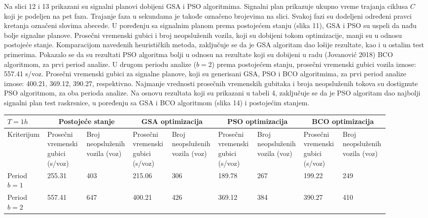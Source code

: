 Na slici 12 i 13 prikazani su signalni planovi dobijeni GSA i PSO algoritmima. Signalni plan prikazuje ukupno vreme trajanja ciklusa $C$ koji je podeljen na pet faza. Trajanje faza u sekundama je takođe označeno brojevima na slici. Svakoj fazi su dodeljeni određeni pravci kretanja označeni slovima abecede. U poređenju sa signalnim planom prema postojećem stanju (slika 11), GSA i PSO su uspeli da nađu bolje signalne planove. Prosečni vremenski gubici i broj neopsluženih vozila, koji su dobijeni tokom optimizacije, manji su u odnosu postojeće stanje. Komparacijom navedenih heurističkih metoda, zaključuje se da je GSA algoritam dao lošije rezultate, kao i u ostalim test primerima. Pokazalo se da su rezultati PSO algoritma bolji u odnosu na rezultate koji su dobijeni u radu (Jovanović 2018) BCO algoritmom, za prvi period analize.  
U drugom periodu analize ($b=2$) prema postojećem stanju, prosečni vremenski gubici vozila iznose: 557.41 s/voz. Prosečni vremenski gubici za signalne planove, koji su generisani GSA, PSO i BCO algoritmima, za prvi period analize iznose: 400.21, 369.12, 390.27, respektivno. Najmanje vrednosti prosečnih vremenskih gubitaka i broja neopsluženih tokova su dostignute PSO algoritmom, za oba perioda analize. Na osnovu rezultata koji su prikazani u tabeli 4, zaključuje se da je PSO algoritam dao najbolji signalni plan test raskrsnice, u poređenju sa GSA i BCO algoritmom (slika 14) i postojećim stanjem.


\begin{table*}
    \begin{center}
      \begin{tabular}{p{0.1\linewidth}p{0.1\linewidth}p{0.1\linewidth}p{0.1\linewidth}p{0.1\linewidth}p{0.1\linewidth}p{0.1\linewidth}p{0.1\linewidth}p{0.1\linewidth}}
        \toprule
        $ T = 1h $ & \multicolumn{2}{c}{\textbf{Postojeće stanje}}
        & \multicolumn{2}{c}{\textbf{GSA optimizacija}}
        & \multicolumn{2}{c}{\textbf{PSO optimizacija}} 
        & \multicolumn{2}{c}{\textbf{BCO optimizacija}} \\ 
        \midrule
  Kriterijum &
  Prosečni vremenski gubici (s/voz) & 
  Broj neopsluženih vozila (voz) & 
  Prosečni vremenski gubici (s/voz) & 
  Broj neopsluženih vozila (voz) & 
  Prosečni vremenski gubici (s/voz) & 
  Broj neopsluženih vozila (voz) & 
  Prosečni vremenski gubici (s/voz) & 
  Broj neopsluženih vozila (voz) \\ 
  \hline
  Period $b=1$ & 
  255.31 & 
  403 & 
  215.06 & 
  306 & 
  189.78 & 
  267 & 
  199.22 & 
  249 \\ 
  \hline
  
  Period $b=2$ & 
  557.41 &
  647  &
  400.21 &
  426 & 
  369.12 & 
  384 &
  390.27 & 
  410 \\
  
  \bottomrule
  
        
      \end{tabular}
    \end{center}
  \end{table*}
  
